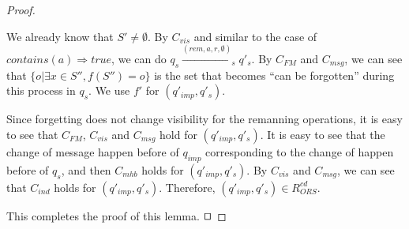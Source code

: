 \begin {proof}
\begin{itemize}
    We already know that $S' \neq \emptyset$. By $C_{\mathit{vis}}$ and similar to the case of $\mathit{contains}(a) \Rightarrow \mathit{true}$, we can do $q_s \xrightarrow{( \mathit{rem},a,r,\emptyset )}_s q'_s$. By $C_{\mathit{FM}}$ and $C_{\mathit{msg}}$, we can see that $\{ o \vert \exists x \in S'', f(S'') = o \}$ is the set that becomes ``can be forgotten'' during this process in $q_s$. We use $f'$ for $(q'_{\mathit{imp}},q'_s)$.

    Since forgetting does not change visibility for the remanning operations, it is easy to see that $C_{\mathit{FM}}$, $C_{\mathit{vis}}$ and $C_{\mathit{msg}}$ hold for $(q'_{\mathit{imp}},q'_s)$. It is easy to see that the change of message happen before of $q_{\mathit{imp}}$ corresponding to the change of happen before of $q_s$, and then $C_{\mathit{mhb}}$ holds for $(q'_{\mathit{imp}},q'_s)$. By $C_{\mathit{vis}}$ and $C_{\mathit{msg}}$, we can see that $C_{\mathit{ind}}$ holds for $(q'_{\mathit{imp}},q'_s)$. Therefore, $(q'_{\mathit{imp}},q'_s) \in R_{\mathit{ORS}}^{\mathit{cd}}$.
\end{itemize}

This completes the proof of this lemma. $\qed$
\end {proof}

































